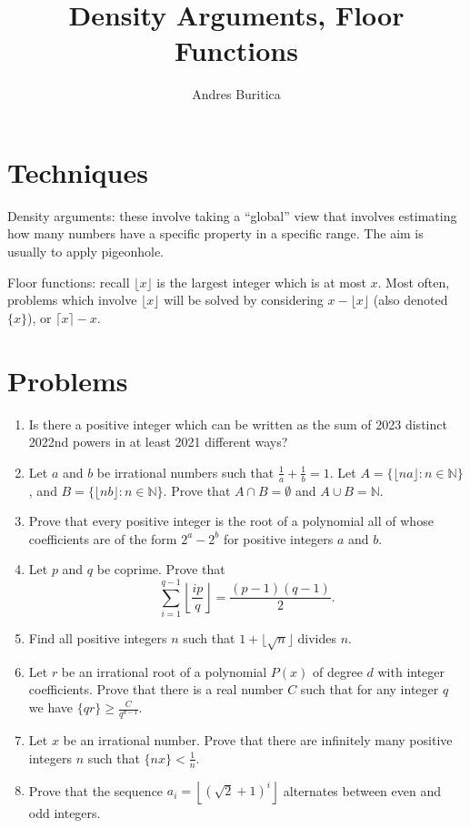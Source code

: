 \documentclass{article}
\title{Density Arguments, Floor Functions}
\author{Andres Buritica}
\date{}
\begin{document}
\maketitle
\section{Techniques}
  Density arguments: these involve taking a ``global'' view that involves
  estimating how many numbers have a specific property in a specific range.
  The aim is usually to apply pigeonhole.

  Floor functions: recall $\lfloor x\rfloor$ is the largest integer which is at
  most $x$. Most often, problems which involve $\lfloor x\rfloor$ will be
  solved by considering $x-\lfloor x\rfloor$ (also denoted $\{x\}$), or $\lceil
  x\rceil-x$.
\section{Problems}
\begin{enumerate}
  \item Is there a positive integer which can be written as the sum of 2023
    distinct 2022nd powers in at least 2021 different ways?
  \item Let $a$ and $b$ be irrational numbers such that $\frac 1a+\frac 1b=1$.
    Let $A=\{\lfloor na\rfloor: n\in\mathbb N\}$, and $B=\{\lfloor nb\rfloor:
    n\in\mathbb N\}$. Prove that $A\cap B=\emptyset$ and $A\cup B=\mathbb N$.
  \item Prove that every positive integer is the root of a polynomial all of whose
    coefficients are of the form $2^a-2^b$ for positive integers $a$ and $b$.
  \item Let $p$ and $q$ be coprime. Prove that
    \[\sum_{i=1}^{q-1}\left\lfloor\frac{ip}{q}\right\rfloor=\frac{(p-1)(q-1)}2.\]
  \item Find all positive integers $n$ such that $1+\lfloor\sqrt n\rfloor$
    divides $n$.
  \item Let $r$ be an irrational root of a polynomial $P(x)$ of degree $d$ with
    integer coefficients. Prove that there is a real number $C$ such that for
    any integer $q$ we have $\{qr\}\ge \frac C{q^{d-1}}$.
  \item Let $x$ be an irrational number. Prove that there are infinitely many
    positive integers $n$ such that $\{nx\}<\frac 1n$.
  \item Prove that the sequence $a_i=\left\lfloor(\sqrt 2+1)^i\right\rfloor$
    alternates between even and odd integers.
\end{enumerate}
\newpage
\end{document}
